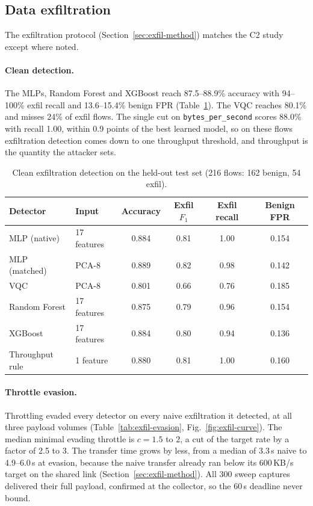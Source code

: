 \documentclass[preprint,12pt]{elsarticle}
\begin{document}
\subsection{Data exfiltration}
\label{sec:exfil-results}
The exfiltration protocol (Section~\ref{sec:exfil-method}) matches the C2 study except where noted.

\paragraph{Clean detection.} The MLPs, Random Forest and XGBoost reach 87.5--88.9\% accuracy with
94--100\% exfil recall and 13.6--15.4\% benign FPR (Table~\ref{tab:exfil-clean}). The VQC reaches 80.1\%
and misses 24\% of exfil flows. The single cut on \texttt{bytes\_per\_second} scores 88.0\% with recall
1.00, within 0.9 points of the best learned model, so on these flows exfiltration detection comes down
to one throughput threshold, and throughput is the quantity the attacker sets.

\begin{table}[htbp]
\centering
\caption{Clean exfiltration detection on the held-out test set (216 flows: 162 benign, 54 exfil).}
\label{tab:exfil-clean}
\setlength{\tabcolsep}{4pt}\small
\begin{tabular}{llcccc}
\toprule
Detector & Input & Accuracy & Exfil $F_1$ & Exfil recall & Benign FPR \\
\midrule
MLP (native)        & 17 features & 0.884 & 0.81 & 1.00 & 0.154 \\
MLP (matched)       & PCA-8       & 0.889 & 0.82 & 0.98 & 0.142 \\
VQC                 & PCA-8       & 0.801 & 0.66 & 0.76 & 0.185 \\
Random Forest       & 17 features & 0.875 & 0.79 & 0.96 & 0.154 \\
XGBoost             & 17 features & 0.884 & 0.80 & 0.94 & 0.136 \\
Throughput rule     & 1 feature   & 0.880 & 0.81 & 1.00 & 0.160 \\
\bottomrule
\end{tabular}
\end{table}

\paragraph{Throttle evasion.} Throttling evaded every detector on every naive exfiltration it detected,
at all three payload volumes (Table~\ref{tab:exfil-evasion}, Fig.~\ref{fig:exfil-curve}). The median
minimal evading throttle is $c=1.5$ to $2$, a cut of the target rate by a factor of 2.5 to 3. The transfer
time grows by less, from a median of 3.3\,s naive to 4.9--6.0\,s at evasion, because the naive transfer
already ran below its 600\,KB/s target on the shared link (Section~\ref{sec:exfil-method}). All 300 sweep
captures delivered their full payload, confirmed at the collector, so the 60\,s deadline never bound.
\end{document}
